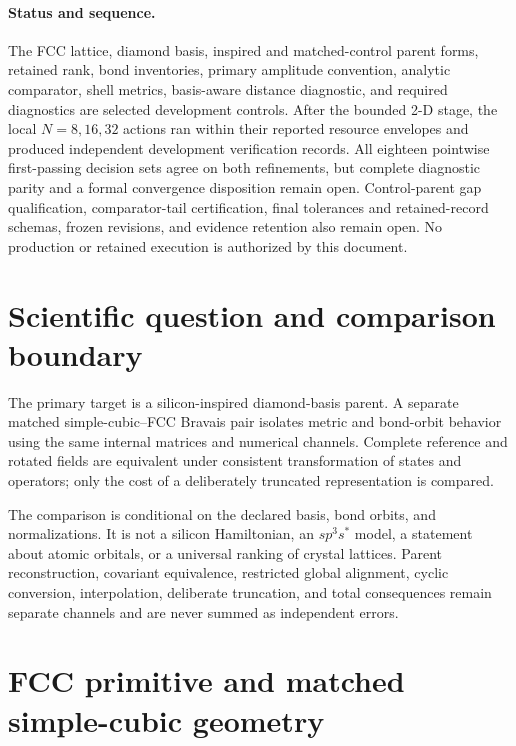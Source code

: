 \documentclass[11pt]{article}
\begin{document}
\paragraph{Status and sequence.}
The FCC lattice, diamond basis, inspired and matched-control parent forms, retained
rank, bond inventories, primary amplitude convention, analytic comparator, shell
metrics, basis-aware distance diagnostic, and required diagnostics are selected
development controls.  After the bounded 2-D stage, the local $N=8,16,32$ actions ran
within their reported resource envelopes and produced independent development
verification records.  All eighteen pointwise first-passing decision sets agree on both
refinements, but complete diagnostic parity and a formal convergence disposition remain
open.  Control-parent gap qualification, comparator-tail certification, final tolerances
and retained-record schemas, frozen revisions, and evidence retention also remain open.
No production or retained execution is authorized by this document.

\section{Scientific question and comparison boundary}

The primary target is a silicon-inspired diamond-basis parent.  A separate matched
simple-cubic--FCC Bravais pair isolates metric and bond-orbit behavior using the same
internal matrices and numerical channels.  Complete reference and rotated fields are
equivalent under consistent transformation of states and operators; only the cost of a
deliberately truncated representation is compared.

The comparison is conditional on the declared basis, bond orbits, and normalizations.
It is not a silicon Hamiltonian, an $sp^3s^*$ model, a statement about atomic orbitals,
or a universal ranking of crystal lattices.  Parent reconstruction, covariant
equivalence, restricted
global alignment, cyclic conversion, interpolation, deliberate truncation, and total
consequences remain separate channels and are never summed as independent errors.

\section{FCC primitive and matched simple-cubic geometry}
\end{document}
